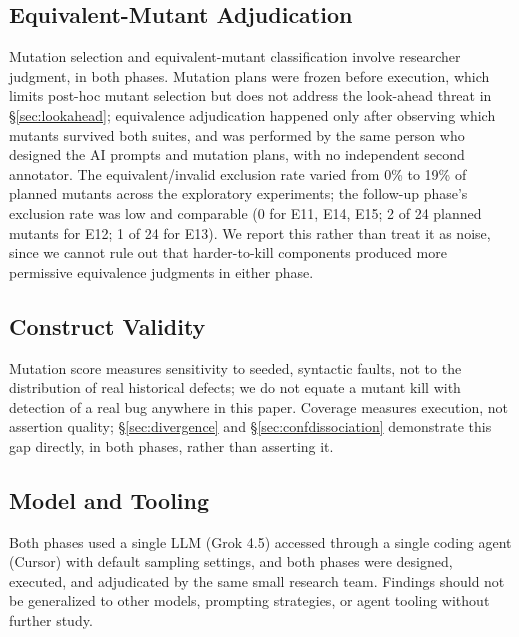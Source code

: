 \documentclass[10pt,conference]{IEEEtran}
\begin{document}
\subsection{Equivalent-Mutant Adjudication}
Mutation selection and equivalent-mutant classification involve researcher judgment, in both phases. Mutation plans were frozen before execution, which limits post-hoc mutant selection but does not address the look-ahead threat in \S\ref{sec:lookahead}; equivalence adjudication happened only after observing which mutants survived both suites, and was performed by the same person who designed the AI prompts and mutation plans, with no independent second annotator. The equivalent/invalid exclusion rate varied from 0\% to 19\% of planned mutants across the exploratory experiments; the follow-up phase's exclusion rate was low and comparable (0 for E11, E14, E15; 2 of 24 planned mutants for E12; 1 of 24 for E13). We report this rather than treat it as noise, since we cannot rule out that harder-to-kill components produced more permissive equivalence judgments in either phase.

\subsection{Construct Validity}
Mutation score measures sensitivity to seeded, syntactic faults, not to the distribution of real historical defects; we do not equate a mutant kill with detection of a real bug anywhere in this paper. Coverage measures execution, not assertion quality; \S\ref{sec:divergence} and \S\ref{sec:confdissociation} demonstrate this gap directly, in both phases, rather than asserting it.

\subsection{Model and Tooling}
Both phases used a single LLM (Grok 4.5) accessed through a single coding agent (Cursor) with default sampling settings, and both phases were designed, executed, and adjudicated by the same small research team. Findings should not be generalized to other models, prompting strategies, or agent tooling without further study.
\end{document}
